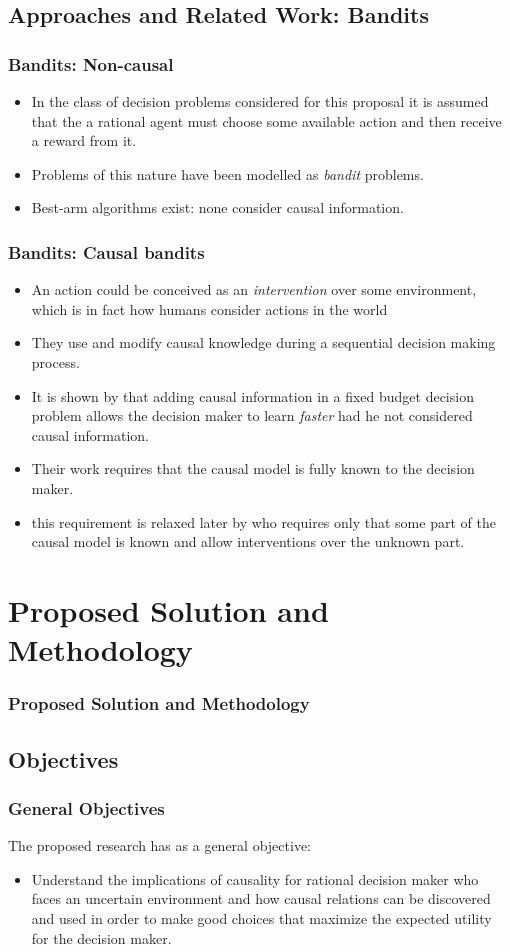 \documentclass{beamer}
\theoremstyle{plain}
\begin{document}
\subsection{Approaches and Related Work: Bandits}
\begin{frame}
\frametitle{Bandits: Non-causal}
\begin{itemize}
\item In the class of decision problems considered for this proposal it is assumed that the a rational agent must choose some available action and then receive a reward from it.
\item Problems of this nature have been modelled as \textit{bandit} problems.
\item Best-arm algorithms exist: none consider causal information.
\end{itemize}
\end{frame}
\begin{frame}
\frametitle{Bandits: Causal bandits}
\begin{itemize}
\item An action could be conceived as an \textit{intervention} over some environment, which is in fact how humans consider actions in the world
\item They use and modify causal knowledge during a sequential decision making process.
\item It is shown by \cite{lattimoreNIPS2016} that adding causal information in a fixed budget decision problem allows the decision maker to learn \textit{faster} had he not considered causal information.
\item Their work requires that the causal model is fully known to the decision maker.
\item this requirement is relaxed later by \cite{sen2017identifying} who requires only that some part of the causal model is known and allow interventions over the unknown part. 
\end{itemize}
\end{frame}

\section{Proposed Solution and Methodology}
\begin{frame}
\frametitle{Proposed Solution and Methodology}
\end{frame}
	\subsection{Objectives}
	\begin{frame}
	\frametitle{General Objectives}
	The proposed research has as a general objective:
	\begin{itemize}
 \item Understand the implications of causality for rational decision maker who faces an uncertain environment and how causal relations can be discovered and used in order to make good choices that maximize the expected utility for the decision maker.
	\end{itemize}
	\end{frame}
	
\end{document}
